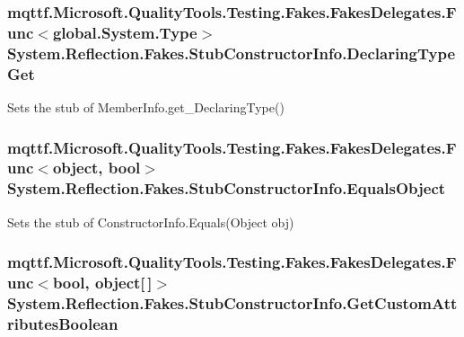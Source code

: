\hypertarget{class_system_1_1_reflection_1_1_fakes_1_1_stub_constructor_info_a3f0d65d62430b51511fcb44f80809e95}{
\subsubsection[{Declaring\-Type\-Get}]{\setlength{\rightskip}{0pt plus 5cm}mqttf.\-Microsoft.\-Quality\-Tools.\-Testing.\-Fakes.\-Fakes\-Delegates.\-Func$<$global.\-System.\-Type$>$ System.\-Reflection.\-Fakes.\-Stub\-Constructor\-Info.\-Declaring\-Type\-Get}}\label{class_system_1_1_reflection_1_1_fakes_1_1_stub_constructor_info_a3f0d65d62430b51511fcb44f80809e95}


Sets the stub of Member\-Info.\-get\-\_\-\-Declaring\-Type()

\hypertarget{class_system_1_1_reflection_1_1_fakes_1_1_stub_constructor_info_a87cfa8b70295b5901acdc5f630292be7}{
\subsubsection[{Equals\-Object}]{\setlength{\rightskip}{0pt plus 5cm}mqttf.\-Microsoft.\-Quality\-Tools.\-Testing.\-Fakes.\-Fakes\-Delegates.\-Func$<$object, bool$>$ System.\-Reflection.\-Fakes.\-Stub\-Constructor\-Info.\-Equals\-Object}}\label{class_system_1_1_reflection_1_1_fakes_1_1_stub_constructor_info_a87cfa8b70295b5901acdc5f630292be7}


Sets the stub of Constructor\-Info.\-Equals(\-Object obj)

\hypertarget{class_system_1_1_reflection_1_1_fakes_1_1_stub_constructor_info_aeec138d85b3206c6511147ffa44aec88}{
\subsubsection[{Get\-Custom\-Attributes\-Boolean}]{\setlength{\rightskip}{0pt plus 5cm}mqttf.\-Microsoft.\-Quality\-Tools.\-Testing.\-Fakes.\-Fakes\-Delegates.\-Func$<$bool, object\mbox{[}$\,$\mbox{]}$>$ System.\-Reflection.\-Fakes.\-Stub\-Constructor\-Info.\-Get\-Custom\-Attributes\-Boolean}}\label{class_system_1_1_reflection_1_1_fakes_1_1_stub_constructor_info_aeec138d85b3206c6511147ffa44aec88}


